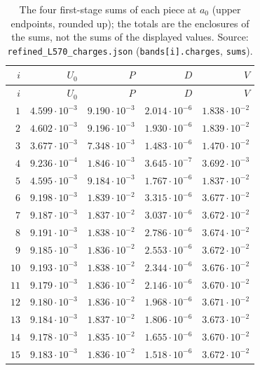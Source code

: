 {\scriptsize\setlength{\tabcolsep}{4pt}\renewcommand{\arraystretch}{0.92}
\begin{longtable}{@{}rrrrr@{}}
\caption{The four first-stage sums of each piece at $a_0$ (upper endpoints, rounded up); the totals are the enclosures of the sums, not the sums of the displayed values. Source: \texttt{refined\_L570\_charges.json} (\texttt{bands[i].charges}, \texttt{sums}).}\label{tab:record:middle-charges}\\
\toprule
$i$ & $U_0$ & $P$ & $D$ & $V$\\
\midrule
\endfirsthead
\toprule
$i$ & $U_0$ & $P$ & $D$ & $V$\\
\midrule
\endhead
\bottomrule
\endfoot
$1$ & $4.599\cdot10^{-3}$ & $9.190\cdot10^{-3}$ & $2.014\cdot10^{-6}$ & $1.838\cdot10^{-2}$\\
$2$ & $4.602\cdot10^{-3}$ & $9.196\cdot10^{-3}$ & $1.930\cdot10^{-6}$ & $1.839\cdot10^{-2}$\\
$3$ & $3.677\cdot10^{-3}$ & $7.348\cdot10^{-3}$ & $1.483\cdot10^{-6}$ & $1.470\cdot10^{-2}$\\
$4$ & $9.236\cdot10^{-4}$ & $1.846\cdot10^{-3}$ & $3.645\cdot10^{-7}$ & $3.692\cdot10^{-3}$\\
$5$ & $4.595\cdot10^{-3}$ & $9.184\cdot10^{-3}$ & $1.767\cdot10^{-6}$ & $1.837\cdot10^{-2}$\\
$6$ & $9.198\cdot10^{-3}$ & $1.839\cdot10^{-2}$ & $3.315\cdot10^{-6}$ & $3.677\cdot10^{-2}$\\
$7$ & $9.187\cdot10^{-3}$ & $1.837\cdot10^{-2}$ & $3.037\cdot10^{-6}$ & $3.672\cdot10^{-2}$\\
$8$ & $9.191\cdot10^{-3}$ & $1.838\cdot10^{-2}$ & $2.786\cdot10^{-6}$ & $3.674\cdot10^{-2}$\\
$9$ & $9.185\cdot10^{-3}$ & $1.836\cdot10^{-2}$ & $2.553\cdot10^{-6}$ & $3.672\cdot10^{-2}$\\
$10$ & $9.193\cdot10^{-3}$ & $1.838\cdot10^{-2}$ & $2.344\cdot10^{-6}$ & $3.676\cdot10^{-2}$\\
$11$ & $9.179\cdot10^{-3}$ & $1.836\cdot10^{-2}$ & $2.146\cdot10^{-6}$ & $3.670\cdot10^{-2}$\\
$12$ & $9.180\cdot10^{-3}$ & $1.836\cdot10^{-2}$ & $1.968\cdot10^{-6}$ & $3.671\cdot10^{-2}$\\
$13$ & $9.184\cdot10^{-3}$ & $1.837\cdot10^{-2}$ & $1.806\cdot10^{-6}$ & $3.673\cdot10^{-2}$\\
$14$ & $9.178\cdot10^{-3}$ & $1.835\cdot10^{-2}$ & $1.655\cdot10^{-6}$ & $3.670\cdot10^{-2}$\\
$15$ & $9.183\cdot10^{-3}$ & $1.836\cdot10^{-2}$ & $1.518\cdot10^{-6}$ & $3.672\cdot10^{-2}$\\

\end{longtable}}
